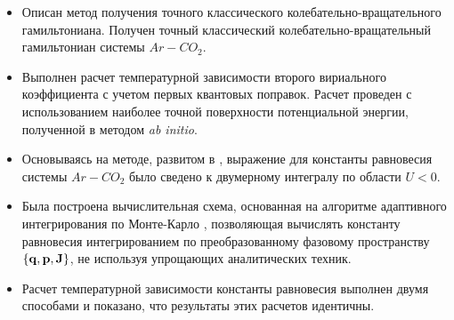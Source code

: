 \begin{itemize}
 \item Описан метод получения точного классического колебательно-вращательного гамильтониана. Получен точный классический колебательно-вращательный гамильтониан системы $Ar-CO_2$.
 \item Выполнен расчет температурной зависимости второго вириального коэффициента с учетом первых квантовых поправок. Расчет проведен с использованием наиболее точной поверхности потенциальной энергии, полученной в \cite{kalugina2017} методом \textit{ab initio}.  
 \item Основываясь на методе, развитом в \cite{vigasin2015}, выражение для константы равновесия системы $Ar-CO_2$ было сведено к двумерному интегралу по области $U < 0$. 
 \item Была построена вычислительная схема, основанная на алгоритме адаптивного интегрирования по Монте-Карло \cite{lepage1978, vegas}, позволяющая вычислять константу равновесия интегрированием по преобразованному фазовому пространству $\left\{ \mathbf{q}, \mathbf{p}, \mathbf{J} \right\}$, не используя упрощающих аналитических техник. 
  \item Расчет температурной зависимости константы равновесия выполнен двумя способами и показано, что результаты этих расчетов идентичны.
\end{itemize}

